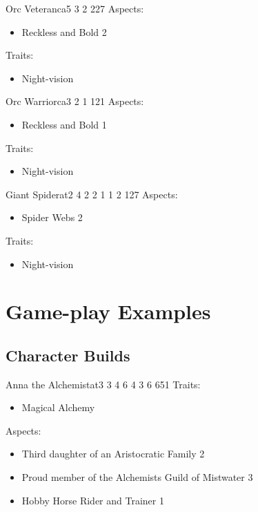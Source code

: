 \documentclass[11pt]{article}
\begin{document}
{\begin{npc}{Orc Veteran}{ca}{5 3 2 2}{27}
Aspects:
\begin{itemize}
\item Reckless and Bold 2
\end{itemize}
Traits:
\begin{itemize}
\item Night-vision
\end{itemize}
\end{npc}

\begin{npc}{Orc Warrior}{ca}{3 2 1 1}{21}
Aspects:
\begin{itemize}
\item Reckless and Bold 1
\end{itemize}
Traits:
\begin{itemize}
\item Night-vision
\end{itemize}
\end{npc}

\begin{npc}{Giant Spider}{at}{2 4 2 2 1 1 2 1}{27}
Aspects:
\begin{itemize}
\item Spider Webs 2
\end{itemize}
Traits:
\begin{itemize}
\item Night-vision
\end{itemize}
\end{npc}


\newpage
\section{Game-play Examples}
\label{sec:org889873d}
\subsection{Character Builds}
\label{sec:orgbf03441}

\begin{npc}{Anna the Alchemist}{at}{3 3 4 6 4 3 6 6}{51}
Traits:
\begin{itemize}
\item Magical Alchemy
\end{itemize}
\columnbreak
Aspects:
\begin{itemize}
\item Third daughter of an Aristocratic Family 2
\item Proud member of the Alchemists Guild of Mistwater 3
\item Hobby Horse Rider and Trainer 1
\end{itemize}
\end{npc}

}
\end{document}
